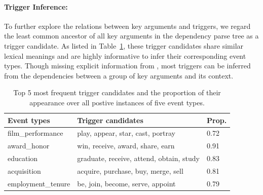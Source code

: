 
\paragraph{Trigger Inference:} To further explore the relations between key arguments and triggers, we regard the least common ancestor of all key arguments in the dependency parse tree as a trigger candidate. As listed in Table~\ref{freqTriggers}, these trigger candidates share similar lexical meanings and are highly informative to infer their corresponding event types. Though missing explicit information from \KB, most triggers can be inferred from the dependencies between a group of key arguments and its context.

\begin{table}
	\small
	\centering
	\begin{tabular}{|l|l|l|} \hline
		Event types & Trigger candidates & Prop. \\ \hline
		film\_performance & play, appear, star, cast, portray & 0.72 \\ \hline
		award\_honor & win, receive, award, share, earn & 0.91 \\ \hline
		education & graduate, receive, attend, obtain, study & 0.83 \\ \hline
		acquisition & acquire, purchase, buy, merge, sell & 0.81 \\ \hline
		employment\_tenure & be, join, become, serve, appoint & 0.79 \\ \hline
	\end{tabular}
	\caption{Top 5 most frequent trigger candidates and the proportion of their appearance over all postive instances of five event types.}
	\label{freqTriggers}
\end{table}

